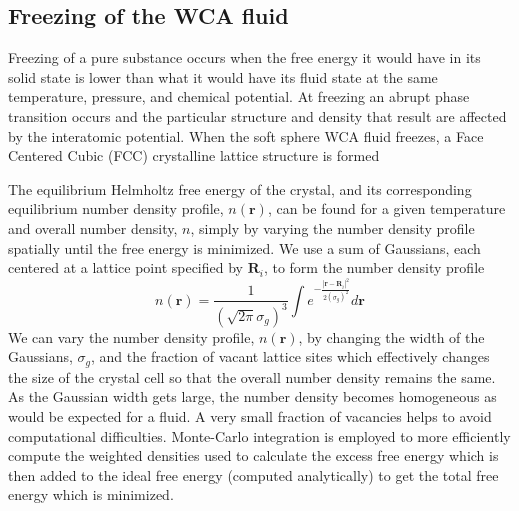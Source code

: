 \documentclass[letterpaper,twocolumn,amsmath,amssymb,prb]{revtex4-1}
\begin{document}

\subsection{Freezing of the WCA fluid}

Freezing of a pure substance occurs when the free energy it would have 
in its solid state is lower than what it would have its 
fluid state at the same temperature, pressure, and chemical potential. 
At freezing an abrupt phase transition occurs and the particular %
structure and density that result are affected by the interatomic potential. 
When the soft sphere WCA fluid freezes, a Face Centered Cubic (FCC) 
crystalline lattice structure is formed~%

The equilibrium Helmholtz free energy of the crystal, and its corresponding 
equilibrium number density profile, $n(\textbf{r})$, can be found for a given 
temperature and overall number density, $n$, simply by varying the number density profile spatially 
until the free energy
is minimized. 
We use a sum of 
Gaussians, each centered at a lattice point specified by $\textbf{R}_i$, to form 
the number density profile 
\begin{equation}n(\textbf{r})= \frac{1}{\left(\sqrt{2\pi}\sigma_{g}\right)^3}
\int{e^{-\frac{|\textbf{r}-\textbf{R}_i|^2}{2\left(\sigma_g\right)^2}}d{\textbf{r}}}  \end{equation}  
We can vary the number density profile, $n(\textbf{r})$, by changing the 
width of the Gaussians, $\sigma_{g}$, 
and the fraction of vacant lattice sites which effectively changes the size 
of the crystal cell so that the overall number density remains the same.
As the Gaussian width gets large, the number 
density becomes homogeneous as would be expected for a fluid. 
A very small fraction of vacancies helps to avoid computational 
difficulties. 
Monte-Carlo integration is employed to more efficiently 
compute the weighted densities used to calculate the excess free energy
which is then 
added to the ideal free energy (computed analytically) to get the total free energy 
which is minimized. 
\end{document}
